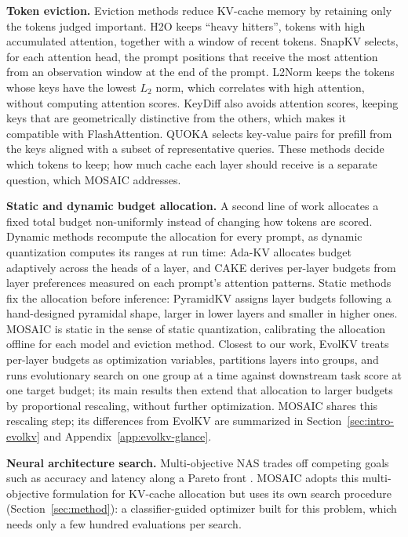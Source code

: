 \documentclass[11pt]{article}
\begin{document}
\textbf{Token eviction.} Eviction methods reduce KV-cache memory by retaining only the tokens judged important. H2O \citep{zhang2023h2o} keeps ``heavy hitters'', tokens with high accumulated attention, together with a window of recent tokens. SnapKV \citep{li2024snapkv} selects, for each attention head, the prompt positions that receive the most attention from an observation window at the end of the prompt. L2Norm \citep{devoto2024l2norm} keeps the tokens whose keys have the lowest $L_2$ norm, which correlates with high attention, without computing attention scores. KeyDiff \citep{park2025keydiff} also avoids attention scores, keeping keys that are geometrically distinctive from the others, which makes it compatible with FlashAttention. QUOKA \citep{jones2026quoka} selects key-value pairs for prefill from the keys aligned with a subset of representative queries. These methods decide which tokens to keep; how much cache each layer should receive is a separate question, which MOSAIC addresses.

\textbf{Static and dynamic budget allocation.} A second line of work allocates a fixed total budget non-uniformly instead of changing how tokens are scored. Dynamic methods recompute the allocation for every prompt, as dynamic quantization computes its ranges at run time: Ada-KV \citep{feng2025adakv} allocates budget adaptively across the heads of a layer, and CAKE \citep{qin2025cake} derives per-layer budgets from layer preferences measured on each prompt's attention patterns. Static methods fix the allocation before inference: PyramidKV \citep{cai2025pyramidkv} assigns layer budgets following a hand-designed pyramidal shape, larger in lower layers and smaller in higher ones. MOSAIC is static in the sense of static quantization, calibrating the allocation offline for each model and eviction method. Closest to our work, EvolKV \citep{yu2025evolkv} treats per-layer budgets as optimization variables, partitions layers into groups, and runs evolutionary search on one group at a time against downstream task score at one target budget; its main results then extend that allocation to larger budgets by proportional rescaling, without further optimization. MOSAIC shares this rescaling step; its differences from EvolKV are summarized in Section~\ref{sec:intro-evolkv} and Appendix~\ref{app:evolkv-glance}.

\textbf{Neural architecture search.} Multi-objective NAS trades off competing goals such as accuracy and latency along a Pareto front \citep{elsken2018neural}. MOSAIC adopts this multi-objective formulation for KV-cache allocation but uses its own search procedure (Section~\ref{sec:method}): a classifier-guided optimizer built for this problem, which needs only a few hundred evaluations per search.
\end{document}
